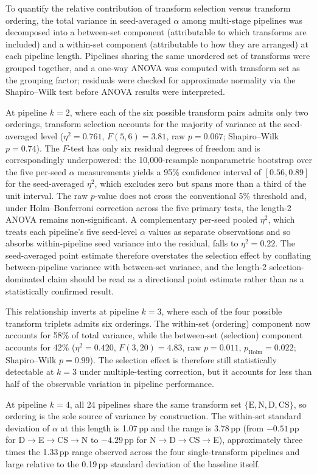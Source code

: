 \documentclass[preprint,5p,times,twocolumn]{elsarticle}
\begin{document}
To quantify the relative contribution of transform selection versus transform ordering, the total variance in seed-averaged $\alpha$ among multi-stage pipelines was decomposed into a between-set component (attributable to which transforms are included) and a within-set component (attributable to how they are arranged) at each pipeline length. Pipelines sharing the same unordered set of transforms were grouped together, and a one-way ANOVA was computed with transform set as the grouping factor; residuals were checked for approximate normality via the Shapiro--Wilk test before ANOVA results were interpreted.

At pipeline $k=2$, where each of the six possible transform pairs admits only two orderings, transform selection accounts for the majority of variance at the seed-averaged level ($\eta^2 = 0.761$, $F(5,6) = 3.81$, raw $p = 0.067$; Shapiro--Wilk $p = 0.74$). The $F$-test has only six residual degrees of freedom and is correspondingly underpowered: the 10{,}000-resample nonparametric bootstrap over the five per-seed $\alpha$ measurements yields a 95\% confidence interval of $[0.56, 0.89]$ for the seed-averaged $\eta^2$, which excludes zero but spans more than a third of the unit interval. The raw $p$-value does not cross the conventional 5\% threshold and, under Holm--Bonferroni correction across the five primary tests, the length-2 ANOVA remains non-significant. A complementary per-seed pooled $\eta^2$, which treats each pipeline's five seed-level $\alpha$ values as separate observations and so absorbs within-pipeline seed variance into the residual, falls to $\eta^2 = 0.22$. The seed-averaged point estimate therefore overstates the selection effect by conflating between-pipeline variance with between-set variance, and the length-2 selection-dominated claim should be read as a directional point estimate rather than as a statistically confirmed result.

This relationship inverts at pipeline $k=3$, where each of the four possible transform triplets admits six orderings. The within-set (ordering) component now accounts for 58\% of total variance, while the between-set (selection) component accounts for 42\% ($\eta^2 = 0.420$, $F(3,20) = 4.83$, raw $p = 0.011$, $p_{\text{Holm}} = 0.022$; Shapiro--Wilk $p = 0.99$). The selection effect is therefore still statistically detectable at $k=3$ under multiple-testing correction, but it accounts for less than half of the observable variation in pipeline performance.

At pipeline $k=4$, all 24 pipelines share the same transform set $\{\text{E}, \text{N}, \text{D}, \text{CS}\}$, so ordering is the sole source of variance by construction. The within-set standard deviation of $\alpha$ at this length is 1.07\,pp and the range is 3.78\,pp (from $-0.51$\,pp for D$\to$E$\to$CS$\to$N to $-4.29$\,pp for N$\to$D$\to$CS$\to$E), approximately three times the 1.33\,pp range observed across the four single-transform pipelines and large relative to the 0.19\,pp standard deviation of the baseline itself.
\end{document}
